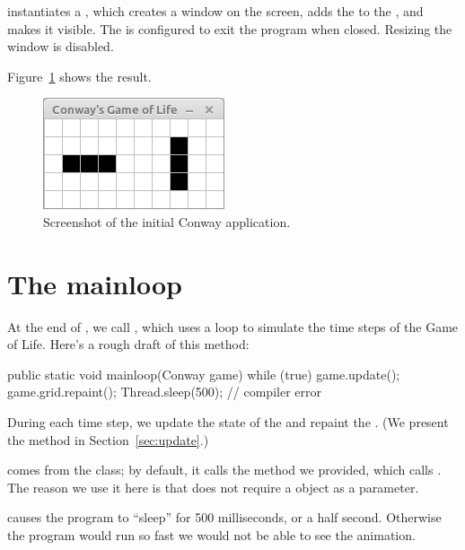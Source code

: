  instantiates a , which creates a window on the screen, adds the  to the , and makes it visible.
The  is configured to exit the program when closed.
Resizing the window is disabled.

Figure~\ref{fig:conway} shows the result.

\begin{figure}[!ht]
\begin{center}
\includegraphics{figs/conway.png}
\caption{Screenshot of the initial Conway application.}
\label{fig:conway}
\end{center}
\end{figure}


\section{The mainloop}
\label{mainloop}

At the end of , we call , which uses a  loop to simulate the time steps of the Game of Life.
Here's a rough draft of this method:

\begin{code}
public static void mainloop(Conway game) {
    while (true) {
        game.update();
        game.grid.repaint();
        Thread.sleep(500);    // compiler error
    }
}
\end{code}

During each time step, we update the state of the  and repaint the .
(We present the  method in Section~\ref{sec:update}.)

 comes from the  class; by default, it calls the  method we provided, which calls .
The reason we use it here is that  does not require a  object as a parameter.

 causes the program to ``sleep'' for 500 milliseconds, or a half second.
Otherwise the program would run so fast we would not be able to see the animation.


